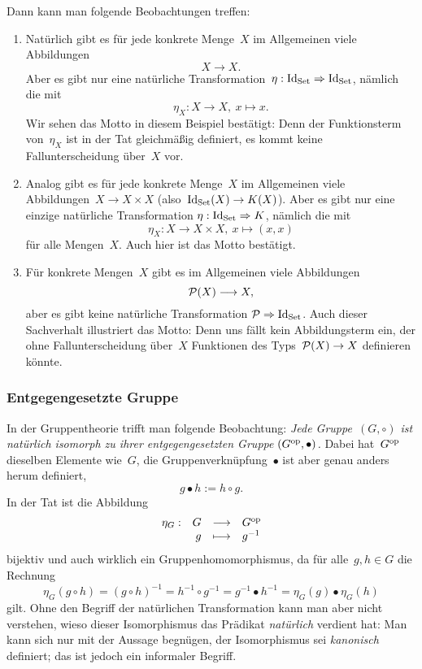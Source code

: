 Dann kann man folgende Beobachtungen treffen:

\begin{enumerate}
\item Natürlich gibt es für jede konkrete Menge~$X$ im Allgemeinen viele
Abbildungen
\[ X \longrightarrow X. \]
Aber es gibt nur eine natürliche Transformation~$\eta : \Id_\Set \Rightarrow
\Id_\Set$, nämlich die mit
\[ \eta_X : X \longrightarrow X,\ x \longmapsto x. \]
Wir sehen das Motto in diesem Beispiel bestätigt: Denn der
Funktionsterm von~$\eta_X$ ist in der Tat gleichmäßig definiert, es kommt keine
Fallunterscheidung über~$X$ vor.
\item Analog gibt es für jede konkrete Menge~$X$ im Allgemeinen viele
Abbildungen~$X \to X \times X$ (also~$\Id_\Set(X) \to K(X)$). Aber es gibt nur
eine einzige natürliche Transformation $\eta : \Id_\Set \Rightarrow K$, nämlich
die mit
\[ \eta_X: X \to X \times X,\ x \mapsto (x,x) \]
für alle Mengen~$X$. Auch hier ist das Motto bestätigt.
\item Für konkrete Mengen~$X$ gibt es im Allgemeinen viele Abbildungen
\[ \P(X) \longrightarrow X, \]
aber es gibt keine natürliche Transformation $\P \Rightarrow \Id_\Set$.
Auch dieser Sachverhalt illustriert das Motto: Denn uns fällt kein
Abbildungsterm ein, der ohne Fallunterscheidung über~$X$ Funktionen des
Typs~$\P(X) \to X$ definieren könnte.
\end{enumerate}


\subsubsection*{Entgegengesetzte Gruppe}

In der Gruppentheorie trifft man folgende Beobachtung: \emph{Jede
Gruppe~$(G,\circ)$ ist natürlich isomorph zu ihrer entgegengesetzten Gruppe
$(G^\op,\bullet)$.}
Dabei hat~$G^\op$ dieselben Elemente wie~$G$, die
Gruppenverknüpfung~$\bullet$ ist aber
genau anders herum definiert,
\[ g \bullet h := h \circ g. \]
In der Tat ist die Abbildung
\[ \begin{array}{@{}rrcl@{}}
  \eta_G : & G &\longrightarrow& G^\op \\
  & g &\longmapsto& g^{-1}
\end{array} \]
bijektiv und auch wirklich ein Gruppenhomomorphismus, da für alle~$g,h \in G$
die Rechnung
\[ \eta_G(g \circ h) = (g \circ h)^{-1} = h^{-1} \circ g^{-1} =
  g^{-1} \bullet h^{-1} = \eta_G(g) \bullet \eta_G(h) \]
gilt. Ohne den Begriff der natürlichen Transformation kann man aber nicht
verstehen, wieso dieser Isomorphismus das Prädikat \emph{natürlich} verdient
hat: Man kann sich nur mit der Aussage begnügen, der Isomorphismus sei
\emph{kanonisch} definiert; das ist jedoch ein informaler Begriff.


